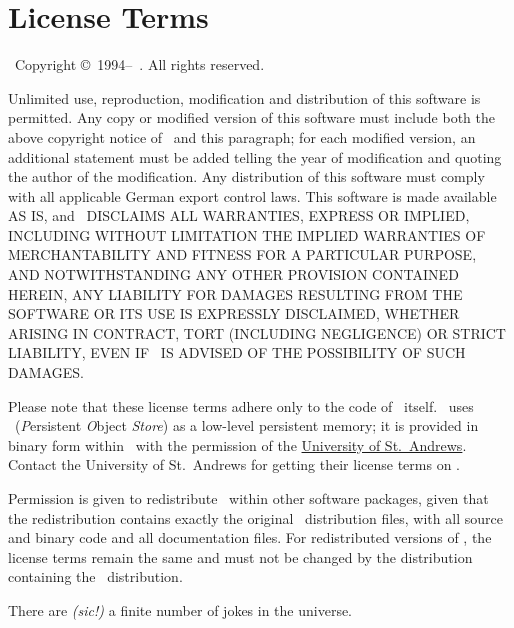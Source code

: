 {\section{License Terms}}%
\label{sec:LicenseTerms}

\edef\THISAUTHOR{\expandafter\uppercase{\thisauthor}}

\plob\ Copyright \copyright\ 1994--\thisyear\ \thisauthor. All
rights reserved.

Unlimited use, reproduction, modification and distribution of this
software is permitted.  Any copy or modified version of this software
must include both the above copyright notice of \thisauthor\ and this
paragraph; for each modified version, an additional statement must be
added telling the year of modification and quoting the author of the
modification.  Any distribution of this software must comply with all
applicable German export control laws.  This software is made
available AS IS, and \THISAUTHOR\ DISCLAIMS ALL
WARRANTIES, EXPRESS OR IMPLIED, INCLUDING WITHOUT LIMITATION THE
IMPLIED WARRANTIES OF MERCHANTABILITY AND FITNESS FOR A PARTICULAR
PURPOSE, AND NOTWITHSTANDING ANY OTHER PROVISION CONTAINED HEREIN, ANY
LIABILITY FOR DAMAGES RESULTING FROM THE SOFTWARE OR ITS USE IS
EXPRESSLY DISCLAIMED, WHETHER ARISING IN CONTRACT, TORT (INCLUDING
NEGLIGENCE) OR STRICT LIABILITY, EVEN IF \THISAUTHOR\ IS
ADVISED OF THE POSSIBILITY OF SUCH DAMAGES.

Please note that these license terms adhere only to the code of \plob\ 
itself. \plob\ uses \postore\ (\textit{P}ersistent \textit{O}bject
\textit{Store}) as a low-level persistent memory; it is provided in
binary form within \plob\ with the permission of the
\href{http://www-ppg.dcs.st-andrews.ac.uk/Default.html}{University of
  St.\ Andrews}. Contact the University of St.\ Andrews for getting
their license terms on \postore.

Permission is given to redistribute \plob\ within other software
packages, given that the redistribution contains exactly the original
\plob\ distribution files, with all source and binary code and all
documentation files. For redistributed versions of \plob, the license
terms remain the same and must not be changed by the distribution
containing the \plob\ distribution.

\vspace*{\fill}
\begin{fortune}
  \hspace*{\fill}There are \emph{(sic!)} a finite number of jokes in
  the universe.
\end{fortune}

